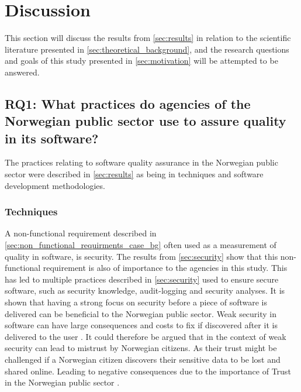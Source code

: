 \chapter{Discussion} \label{sec:discussion}
This section will discuss the results from \autoref{sec:results} in relation to the scientific literature presented in \autoref{sec:theoretical_background}, and the research questions and goals of this study presented in \autoref{sec:motivation} will be attempted to be answered.

\section{RQ1: What practices do agencies of the Norwegian public sector use to assure quality in its software?}
The practices relating to software quality assurance in the Norwegian public sector were described in \autoref{sec:results} as being in techniques and software development methodologies.

\subsection{Techniques}
A non-functional requirement described in \autoref{sec:non_functional_requirments_case_bg} often used as a measurement of quality in software, is security. The results from \autoref{sec:security} show that this non-functional requirement is also of importance to the agencies in this study. This has led to multiple practices described in \autoref{sec:security} used to ensure secure software, such as security knowledge, audit-logging and security analyses. It is shown that having a strong focus on security before a piece of software is delivered can be beneficial to the Norwegian public sector. Weak security in software can have large consequences and costs to fix if discovered after it is delivered to the user \cite{csw_2011}. It could therefore be argued that in the context of weak security can lead to mistrust by Norwegian citizens. As their trust might be challenged if a Norwegian citizen discovers their sensitive data to be lost and shared online. Leading to negative consequences due to the importance of Trust in the Norwegian public sector \cite{oecd_2022}.


